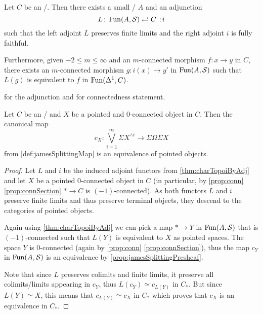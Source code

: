 \begin{thm}\label{thm:charTopoiByAdj}
    Let $C$ be an \inftytop/.
    Then there exists a small \inftycat/ $A$ and an adjunction
    \begin{equation*}
        L\colon\Fun(A,\spaces)\rightleftarrows C\mkern+3mu:\mkern-3mu i
    \end{equation*}
    such that the left adjoint $L$ preserves finite limits and the right adjoint $i$ is fully faithful.

    Furthermore, given $-2\leq m\leq\infty$ and an $m$-connected morphism $f\colon x\to y$ in $C$, there exists an $m$-connected morphism $g\colon i(x)\to y'$ in $\operatorname{Fun}(A,\mathcal{S})$ such that $L(g)$ is equivalent to $f$ in $\operatorname{Fun}(\Delta^1,C)$.
    \begin{reference}
        \cite[Theorem 6.1.0.6 (1) and (2)]{HTT} for the adjunction and \cite[Remark 6.5.1.15]{HTT} for connectedness statement.
    \end{reference}
\end{thm}
\begin{corollary}\label{lem:genTopoiComparisonMapEq}
    Let $C$ be an \inftytop/ and $X$ be a pointed and $0$-connected object in $C$.
    Then the canonical map 
    \begin{equation*}
        c_X\colon\bigvee\limits_{i=1}^{\infty}\Sigma X^{\wedge i}\to\Sigma\Omega\Sigma X
    \end{equation*}
    from \cref{def:jamesSplittingMap} is an equivalence of pointed objects.
    \begin{proof}
        Let $L$ and $i$ be the induced adjoint functors from \cref{thm:charTopoiByAdj} and let $X$ be a pointed $0$-connected object in $C$ (in particular, by \cref{prop:conn} \ref{prop:connSection} $*\to C$ is $(-1)$-connected).
        As both functors $L$ and $i$ preserve finite limits and thus preserve terminal objects, they descend to the categories of pointed objects.
        
        Again using \cref{thm:charTopoiByAdj} we can pick a map $*\to Y$ in $\operatorname{Fun}(A,\mathcal{S})$ that is $(-1)$-connected such that $L(Y)$ is equivalent to $X$ as pointed spaces.
        The space $Y$ is $0$-connected (again by \cref{prop:conn} \ref{prop:connSection}), thus the map $c_Y$ in $\operatorname{Fun}(A,\mathcal{S})$ is an equivalence by \cref{prop:jamesSplittingPresheaf}.
        
        Note that since $L$ preserves colimits and finite limits, it preserve all colimits/limits appearing in $c_Y$, thus $L(c_Y)\simeq c_{L(Y)}$ in $C_*$.
        But since $L(Y)\simeq X$, this means that $c_{L(Y)}\simeq c_X$ in $C_*$ which proves that $c_X$ is an equivalence in $C_*$.
    \end{proof}
\end{corollary}
